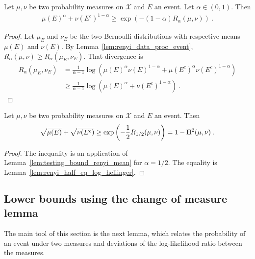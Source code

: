 \begin{lemma}
  \label{lem:testing_bound_renyi_mean}
  Let $\mu, \nu$ be two probability measures on $\mathcal X$ and $E$ an event. Let $\alpha \in (0,1)$. Then
  \begin{align*}
  \mu(E)^\alpha + \nu(E^c)^{1 - \alpha}
  \ge \exp\left(-(1 - \alpha) R_{\alpha}(\mu, \nu)\right)
  \: .
  \end{align*}
\end{lemma}

\begin{proof}
Let $\mu_E$ and $\nu_E$ be the two Bernoulli distributions with respective means $\mu(E)$ and $\nu(E)$.
By Lemma~\ref{lem:renyi_data_proc_event}, $R_\alpha(\mu, \nu) \ge R_\alpha(\mu_E, \nu_E)$. That divergence is
\begin{align*}
R_\alpha(\mu_E, \nu_E)
&= \frac{1}{\alpha - 1}\log \left(\mu(E)^\alpha \nu(E)^{1 - \alpha}
  + \mu(E^c)^\alpha \nu(E^c)^{1 - \alpha}\right)
\\
&\ge \frac{1}{\alpha - 1}\log \left(\mu(E)^\alpha + \nu(E^c)^{1 - \alpha}\right)
\: .
\end{align*}
\end{proof}

\begin{corollary}
  \label{cor:testing_bound_hellinger}
  Let $\mu, \nu$ be two probability measures on $\mathcal X$ and $E$ an event. Then
  \begin{align*}
  \sqrt{\mu(E)} + \sqrt{\nu(E^c)}
  \ge \exp\left(-\frac{1}{2} R_{1/2}(\mu, \nu)\right)
  = 1 - \operatorname{H^2}(\mu, \nu)
  \: .
  \end{align*}
\end{corollary}

\begin{proof}
The inequality is an application of Lemma~\ref{lem:testing_bound_renyi_mean} for $\alpha = 1/2$. The equality is Lemma~\ref{lem:renyi_half_eq_log_hellinger}.
\end{proof}



\subsection{Lower bounds using the change of measure lemma}

The main tool of this section is the next lemma, which relates the probability of an event under two measures and deviations of the log-likelihood ratio between the measures.

